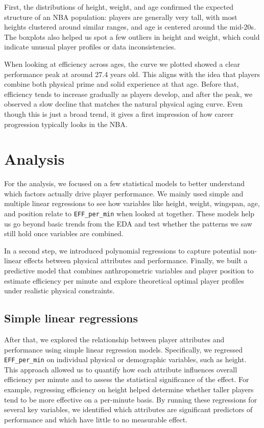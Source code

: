 \documentclass[
  letterpaper,
  DIV=11,
  numbers=noendperiod]{scrartcl}
\begin{document}
First, the distributions of height, weight, and age confirmed the
expected structure of an NBA population: players are generally very
tall, with most heights clustered around similar ranges, and age is
centered around the mid-20s. The boxplots also helped us spot a few
outliers in height and weight, which could indicate unusual player
profiles or data inconsistencies.

When looking at efficiency across ages, the curve we plotted showed a
clear performance peak at around 27.4 years old. This aligns with the
idea that players combine both physical prime and solid experience at
that age. Before that, efficiency tends to increase gradually as players
develop, and after the peak, we observed a slow decline that matches the
natural physical aging curve. Even though this is just a broad trend, it
gives a first impression of how career progression typically looks in
the NBA.

\section{Analysis}\label{analysis}

For the analysis, we focused on a few statistical models to better
understand which factors actually drive player performance. We mainly
used simple and multiple linear regressions to see how variables like
height, weight, wingspan, age, and position relate to
\texttt{EFF\_per\_min} when looked at together. These models help us go
beyond basic trends from the EDA and test whether the patterns we saw
still hold once variables are combined.

In a second step, we introduced polynomial regressions to capture
potential non-linear effects between physical attributes and
performance. Finally, we built a predictive model that combines
anthropometric variables and player position to estimate efficiency per
minute and explore theoretical optimal player profiles under realistic
physical constraints.

\subsection{Simple linear regressions}\label{simple-linear-regressions}

After that, we explored the relationship between player attributes and
performance using simple linear regression models. Specifically, we
regressed \texttt{EFF\_per\_min} on individual physical or demographic
variables, such as height. This approach allowed us to quantify how each
attribute influences overall efficiency per minute and to assess the
statistical significance of the effect. For example, regressing
efficiency on height helped determine whether taller players tend to be
more effective on a per-minute basis. By running these regressions for
several key variables, we identified which attributes are significant
predictors of performance and which have little to no measurable effect.
\end{document}
